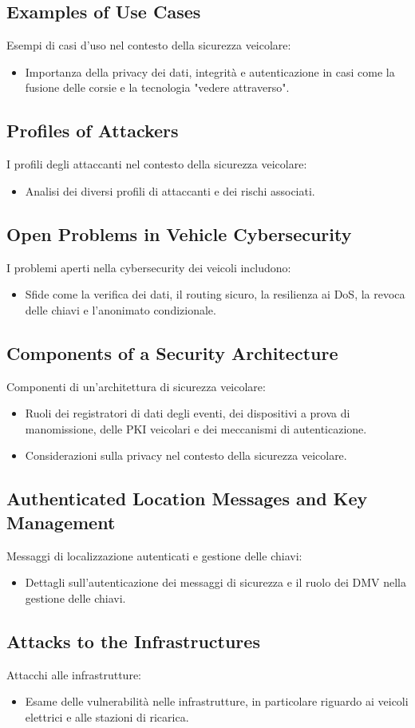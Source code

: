 \subsection{Examples of Use Cases} Esempi di casi d'uso nel contesto della
sicurezza veicolare: \begin{itemize} \item Importanza della privacy dei dati,
integrità e autenticazione in casi come la fusione delle corsie e la tecnologia
"vedere attraverso". \end{itemize}

\subsection{Profiles of Attackers} I profili degli attaccanti nel contesto della
sicurezza veicolare: \begin{itemize} \item Analisi dei diversi profili di
attaccanti e dei rischi associati. \end{itemize}

\subsection{Open Problems in Vehicle Cybersecurity} I problemi aperti nella
cybersecurity dei veicoli includono: \begin{itemize} \item Sfide come la
verifica dei dati, il routing sicuro, la resilienza ai DoS, la revoca delle
chiavi e l'anonimato condizionale. \end{itemize}

\subsection{Components of a Security Architecture} Componenti di un'architettura
di sicurezza veicolare: \begin{itemize} \item Ruoli dei registratori di dati
degli eventi, dei dispositivi a prova di manomissione, delle PKI veicolari e dei
meccanismi di autenticazione. \item Considerazioni sulla privacy nel contesto
della sicurezza veicolare. \end{itemize}

\subsection{Authenticated Location Messages and Key Management} Messaggi di
localizzazione autenticati e gestione delle chiavi: \begin{itemize} \item
Dettagli sull'autenticazione dei messaggi di sicurezza e il ruolo dei DMV nella
gestione delle chiavi. \end{itemize}

\subsection{Attacks to the Infrastructures} Attacchi alle infrastrutture:
\begin{itemize} \item Esame delle vulnerabilità nelle infrastrutture, in
particolare riguardo ai veicoli elettrici e alle stazioni di ricarica.
\end{itemize}

